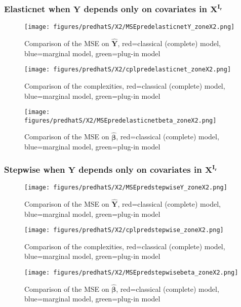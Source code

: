 \documentclass[12pt,a4paper]{report}
\begin{document}
\subsubsection{Elasticnet when $\boldsymbol{Y}$ depends only on covariates in $\boldsymbol{X^{I_r}}$}

	\begin{figure}[h!]
	\centering
		  \texttt{[image: figures/predhatS/X2/MSEpredelasticnetY\_zoneX2.png]}
		\caption{Comparison of the MSE on $\hat{\boldsymbol{Y}}$, red=classical (complete) model, blue=marginal model, green=plug-in model}\label{MSEpredelasticnetY_zoneX2}
	\end{figure}
	\begin{figure}[h!]
	\centering
		  \texttt{[image: figures/predhatS/X2/cplpredelasticnet\_zoneX2.png]}
		\caption{Comparison of the complexities, red=classical (complete) model, blue=marginal model, green=plug-in model}\label{cplpredelasticnet_zoneX2}
	\end{figure}
	\begin{figure}[h!]
	\centering
		  \texttt{[image: figures/predhatS/X2/MSEpredelasticnetbeta\_zoneX2.png]}
		\caption{Comparison of the MSE on $\hat{\boldsymbol{\beta}}$, red=classical (complete) model, blue=marginal model, green=plug-in model}\label{MSEpredelasticnetbeta_zoneX2}
	\end{figure}
	\FloatBarrier
\newpage
\subsubsection{Stepwise when $\boldsymbol{Y}$ depends only on covariates in $\boldsymbol{X^{I_r}}$}

	\begin{figure}[h!]
	\centering
		  \texttt{[image: figures/predhatS/X2/MSEpredstepwiseY\_zoneX2.png]}
		\caption{Comparison of the MSE on $\hat{\boldsymbol{Y}}$, red=classical (complete) model, blue=marginal model, green=plug-in model}\label{MSEpredstepwiseY_zoneX2}
	\end{figure}
	\begin{figure}[h!]
	\centering
		  \texttt{[image: figures/predhatS/X2/cplpredstepwise\_zoneX2.png]}
		\caption{Comparison of the complexities, red=classical (complete) model, blue=marginal model, green=plug-in model}\label{cplpredstepwise_zoneX2}
	\end{figure}
	\begin{figure}[h!]
	\centering
		  \texttt{[image: figures/predhatS/X2/MSEpredstepwisebeta\_zoneX2.png]}
		\caption{Comparison of the MSE on $\hat{\boldsymbol{\beta}}$, red=classical (complete) model, blue=marginal model, green=plug-in model}\label{MSEpredstepwisebeta_zoneX2}
	\end{figure}
	\FloatBarrier
\newpage
\end{document}
